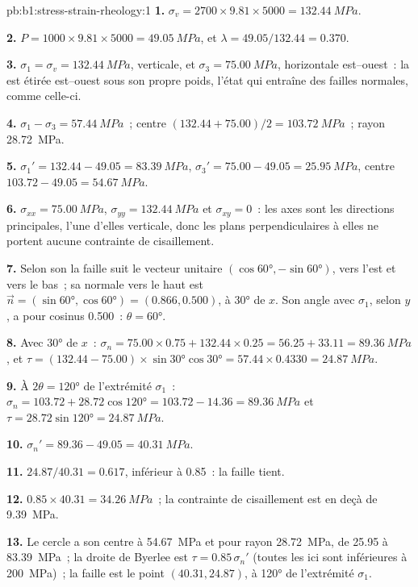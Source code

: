 \begin{solution}{pb:b1:stress-strain-rheology:1}
\textbf{1.} $\sigma_v = 2700\times9.81\times5000 = \qty{132.44}{MPa}$.

\textbf{2.} $P = 1000\times9.81\times5000 = \qty{49.05}{MPa}$, et
$\lambda = 49.05/132.44 = 0.370$.

\textbf{3.} $\sigma_1 = \sigma_v = \qty{132.44}{MPa}$, verticale, et
$\sigma_3 = \qty{75.00}{MPa}$, horizontale est--ouest~: la  est étirée
est--ouest sous son propre poids, l'état qui entraîne des failles
normales, comme celle-ci.

\textbf{4.} $\sigma_1 - \sigma_3 = \qty{57.44}{MPa}$~; centre
$(132.44 + 75.00)/2 = \qty{103.72}{MPa}$~; rayon \qty{28.72}{MPa}.

\textbf{5.} $\sigma_1' = 132.44 - 49.05 = \qty{83.39}{MPa}$, $\sigma_3' =
75.00 - 49.05 = \qty{25.95}{MPa}$, centre $103.72 - 49.05 = \qty{54.67}{MPa}$.

\textbf{6.} $\sigma_{xx} = \qty{75.00}{MPa}$, $\sigma_{yy} = \qty{132.44}{MPa}$
et $\sigma_{xy} = 0$~: les axes sont les directions principales, l'une d'elles
verticale, donc les plans perpendiculaires à elles ne portent aucune contrainte de cisaillement.

\textbf{7.} Selon son  la faille suit le vecteur unitaire
$(\cos\ang{60}, -\sin\ang{60})$, vers l'est et vers le bas~; sa normale vers le haut est
$\vec n = (\sin\ang{60}, \cos\ang{60}) = (0.866, 0.500)$, à \ang{30} de
$x$. Son angle avec $\sigma_1$, selon $y$, a pour cosinus
0.500~: $\theta = \ang{60}$.

\textbf{8.} Avec \ang{30} de $x$~: $\sigma_n = 75.00\times0.75 + 132.44\times0.25
= 56.25 + 33.11 = \qty{89.36}{MPa}$, et $\tau = (132.44 - 75.00)\times
\sin\ang{30}\cos\ang{30} = 57.44\times0.4330 = \qty{24.87}{MPa}$.

\textbf{9.} À $2\theta = \ang{120}$ de l'extrémité $\sigma_1$~:
$\sigma_n = 103.72 + 28.72\cos\ang{120} = 103.72 - 14.36 = \qty{89.36}{MPa}$
et $\tau = 28.72\sin\ang{120} = \qty{24.87}{MPa}$.

\textbf{10.} $\sigma_n' = 89.36 - 49.05 = \qty{40.31}{MPa}$.

\textbf{11.} $24.87/40.31 = 0.617$, inférieur à 0.85~: la faille tient.

\textbf{12.} $0.85\times40.31 = \qty{34.26}{MPa}$~; la contrainte de cisaillement est
en deçà de \qty{9.39}{MPa}.

\textbf{13.} Le cercle a son centre à \qty{54.67}{MPa} et pour rayon
\qty{28.72}{MPa}, de \num{25.95} à \qty{83.39}{MPa}~; la droite de Byerlee est
$\tau = 0.85\,\sigma_n'$ (toutes les  ici sont inférieures à
\qty{200}{MPa})~; la faille est le point $(40.31, 24.87)$, à \ang{120} de
l'extrémité $\sigma_1$.


\end{solution}
